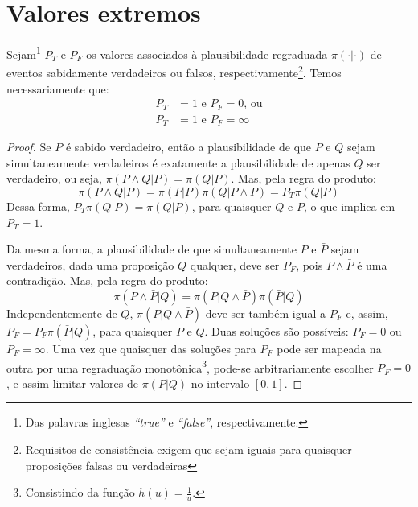 \section{Valores extremos} 
\begin{Teorema}
 Sejam\footnote{Das palavras inglesas \emph{``true''} e \emph{``false''}, respectivamente.} $P_T$ e $P_F$ os valores associados à plausibilidade regraduada $\pi(\cdot| \cdot)$ de eventos sabidamente verdadeiros ou falsos, respectivamente\footnote{Requisitos de consistência exigem que sejam iguais para quaisquer proposições falsas ou verdadeiras}. Temos necessariamente que:
 \begin{align}
  P_T &= 1 \text{ e } P_F = 0  \text{, ou}\\
  P_T &= 1 \text{ e } P_F = \infty
 \end{align}


\begin{proof}
Se $P$ é sabido verdadeiro, então a plausibilidade de que $P$ e $Q$ sejam simultaneamente verdadeiros é exatamente a plausibilidade de apenas $Q$ ser verdadeiro, ou seja, $\pi(P\wedge Q|P) = \pi(Q|P)$. Mas, pela regra do produto:
\[
 \pi(P\wedge Q|P) = \pi(P|P) \pi(Q|P\wedge P) = P_T \pi(Q|P) 
\]
Dessa forma, $P_T \pi(Q|P) = \pi(Q|P)$, para quaisquer $Q$ e $P$, o que implica em $P_T = 1$. 

Da mesma forma, a plausibilidade de que simultaneamente $P$ e $\bar{P}$ sejam verdadeiros, dada uma proposição $Q$ qualquer, deve ser $P_F$, pois $P\wedge\bar{P}$ é uma contradição. Mas, pela regra do produto:
\[
 \pi(P\wedge\bar{P}|Q) = \pi(P | Q\wedge\bar{P}) \pi(\bar{P}|Q)
\]
Independentemente de $Q$, $\pi(P|Q\wedge\bar{P})$ deve ser também igual a $P_F$ e, assim, $P_F = P_F \pi(\bar{P}|Q)$, para quaisquer $P$ e $Q$. Duas soluções são possíveis: $P_F = 0$ ou $P_F = \infty$. Uma vez que quaisquer das soluções para $P_F$ pode ser mapeada na outra por uma regraduação monotônica\footnote{Consistindo da função $h(u) = \frac{1}{u}$.}, pode-se arbitrariamente escolher $P_F = 0$, e assim limitar valores de $\pi(P|Q)$ no intervalo $[0,1]$. 
\end{proof}
\end{Teorema}

